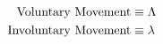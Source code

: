 \begin{align}
  \text{Voluntary Movement}   &\equiv \Lambda \label{eq:voluntary_movement} \\
  \text{Involuntary Movement} &\equiv \lambda \label{eq:involuntary_movement}
\end{align}
